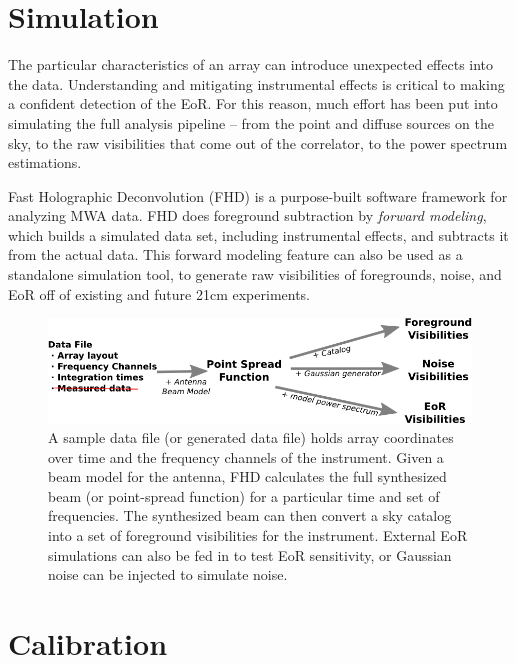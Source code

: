 \documentclass[a0,landscape]{a0poster}
\begin{document}
\begin{multicols}{4}
\columnbreak
\section*{Simulation}

The particular characteristics of an array can introduce unexpected effects into the data. Understanding and mitigating instrumental effects is critical to making a confident detection of the EoR. For this reason, much effort has been put into simulating the full analysis pipeline -- from the point and diffuse sources on the sky, to the raw visibilities that come out of the correlator, to the power spectrum estimations.

Fast Holographic Deconvolution (FHD) is a purpose-built software framework for analyzing MWA data. FHD does foreground subtraction by \emph{forward modeling}, which builds a simulated data set, including instrumental effects, and subtracts it from the actual data. This forward modeling feature can also be used as a standalone simulation tool, to generate raw visibilities of foregrounds, noise, and EoR off of existing and future 21cm experiments.

\begin{figure}[H]
\centering
\includegraphics[scale=.9]{figures/sim_flowchart.png}
\caption{A sample data file (or generated data file) holds array coordinates over time and the frequency channels of the instrument. Given a beam model for the antenna, FHD calculates the full synthesized beam (or point-spread function) for a particular time and set of frequencies. The synthesized beam can then convert a sky catalog into a set of foreground visibilities for the instrument. External EoR simulations can also be fed in to test EoR sensitivity, or Gaussian noise can be injected to simulate noise.}
\end{figure}

\section*{Calibration}


\end{multicols}
\end{document}
